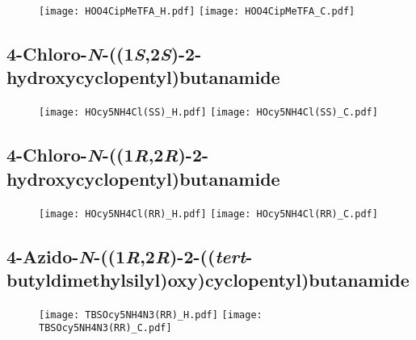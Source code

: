\begin{figure}[H]
	\centering
		\texttt{[image: HOO4CipMeTFA\_H.pdf]}
		\texttt{[image: HOO4CipMeTFA\_C.pdf]}
\end{figure}

\subsection{4\hyp{}Chloro\hyp{}\textit{N}\hyp{}((1\textit{S},2\textit{S})\hyp{}2\hyp{}hydroxycyclopentyl)butanamide }

\begin{figure}[H]
	\centering
		\texttt{[image: HOcy5NH4Cl(SS)\_H.pdf]}
		\texttt{[image: HOcy5NH4Cl(SS)\_C.pdf]}
\end{figure}

\subsection{4\hyp{}Chloro\hyp{}\textit{N}\hyp{}((1\textit{R},2\textit{R})\hyp{}2\hyp{}hydroxycyclopentyl)butanamide }

\begin{figure}[H]
	\centering
		\texttt{[image: HOcy5NH4Cl(RR)\_H.pdf]}
		\texttt{[image: HOcy5NH4Cl(RR)\_C.pdf]}
\end{figure}

\subsection{4\hyp{}Azido\hyp{}\textit{N}\hyp{}((1\textit{R},2\textit{R})\hyp{}2\hyp{}((\textit{tert}\hyp{}butyldimethylsilyl)oxy)cyclopentyl)butanamide }

\begin{figure}[H]
	\centering
		\texttt{[image: TBSOcy5NH4N3(RR)\_H.pdf]}
		\texttt{[image: TBSOcy5NH4N3(RR)\_C.pdf]}
\end{figure}

